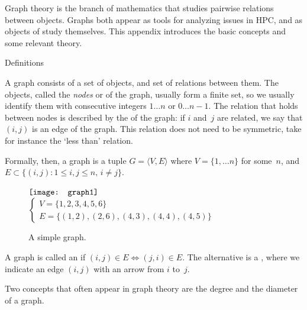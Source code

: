 
Graph theory is the branch of mathematics that studies pairwise
relations between objects. Graphs both appear as tools for analyzing
issues in \ac{HPC}, and as objects of study themselves. This
appendix introduces the basic concepts and some relevant theory.

 {Definitions}

A graph consists of a set of objects, and set of relations between them.
The objects, called the \emph{nodes}
or  of the graph, usually form a finite set, so we
usually identify them with consecutive integers $1\ldots n$ or $0\ldots
n-1$. The relation that holds between nodes is described by the
 of the graph: if $i$ and~$j$ are related, we say
that $( i,j)$ is an edge of the graph. This relation does not need to
be symmetric, take for instance the `less than' relation.

Formally, then, a graph is a tuple $G=\langle V,E\rangle$ where
$V=\{1,\ldots n\}$ for some~$n$, and $E\subset\{(i,j)\colon 1\leq
i,j\leq n,\,i\not=j\}$.

\begin{figure}[ht]
  \hbox{$\vcenter{\hbox{%
        \texttt{[image: graph1]}
    }}$%
    $
    \begin{cases}
      V=\{1,2,3,4,5,6\}\\
      E=\{ (1,2),(2,6),(4,3),(4,4),(4,5)\}
    \end{cases}
    $}
  \caption{A simple graph.}
  \label{fig:graph1}  
\end{figure}

A graph is called an  if $(i,j)\in
E\Leftrightarrow (j,i)\in E$. The alternative is a
, where we indicate an edge $(i,j)$ with
an arrow from $i$ to~$j$.

Two concepts that often appear in graph theory are the
degree and the diameter of a graph. 

